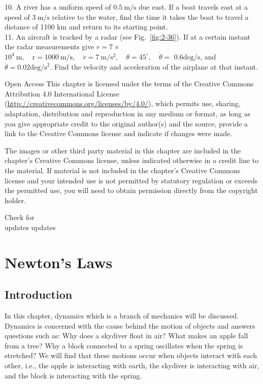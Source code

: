 \documentclass[10pt]{article}
\numberwithin{equation}{section}
\begin{document}
10. A river has a uniform speed of $0.5 \mathrm{~m} / \mathrm{s}$ due east. If a boat travels east at a speed of $3 \mathrm{~m} / \mathrm{s}$ relative to the water, find the time it takes the boat to travel a distance of 1100 km and return to its starting point.\\
11. An aircraft is tracked by a radar (see Fig.~\ref{fig:2-36}). If at a certain instant the radar measurements give $r=7 \times$ $10^{4} \mathrm{~m}, \quad \mathrm{r}=1000 \mathrm{~m} / \mathrm{s}, \quad \ddot{r}=7 \mathrm{~m} / \mathrm{s}^{2}, \quad \theta=45^{\circ}, \quad \dot{\theta}=$ $0.6 \mathrm{deg} / \mathrm{s}$, and $\ddot{\theta}=0.02 \mathrm{deg} / \mathrm{s}^{2}$. Find the velocity and acceleration of the airplane at that instant.

Open Access This chapter is licensed under the terms of the Creative Commons Attribution 4.0 International License (\href{http://creativecommons.org/licenses/by/4.0/}{http://creativecommons.org/licenses/by/4.0/}), which permits use, sharing, adaptation, distribution and reproduction in any medium or format, as long as you give appropriate credit to the original author(s) and the source, provide a link to the Creative Commons license and indicate if changes were made.

The images or other third party material in this chapter are included in the chapter's Creative Commons license, unless indicated otherwise in a credit line to the material. If material is not included in the chapter's Creative Commons license and your intended use is not permitted by statutory regulation or exceeds the permitted use, you will need to obtain permission directly from the copyright holder.

Check for\\
updates updates

\section{Newton's Laws}\label{chap:3}
\subsection{Introduction}\label{sec:3-1}
In this chapter, dynamics which is a branch of mechanics will be discussed. Dynamics is concerned with the cause behind the motion of objects and answers questions such as: Why does a skydiver float in air? What makes an apple fall from a tree? Why a block connected to a spring oscillates when the spring is stretched? We will find that these motions occur when objects interact with each other, i.e., the apple is interacting with earth, the skydiver is interacting with air, and the block is interacting with the spring.
\end{document}
